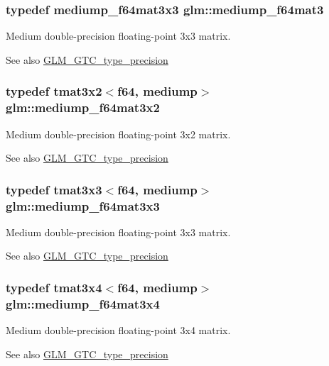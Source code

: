 \subsubsection[{mediump\+\_\+f64mat3}]{\setlength{\rightskip}{0pt plus 5cm}typedef {\bf mediump\+\_\+f64mat3x3} {\bf glm\+::mediump\+\_\+f64mat3}}\label{namespaceglm_ae38a4a0b57e25d9cbb153dcaab9432ec}
Medium double-\/precision floating-\/point 3x3 matrix. \begin{DoxySeeAlso}{See also}
\hyperlink{group__gtc__type__precision}{G\+L\+M\+\_\+\+G\+T\+C\+\_\+type\+\_\+precision} 
\end{DoxySeeAlso}
\hypertarget{namespaceglm_a3f8509c2b3d9918ae271af16e5b7a8a2}{}
\subsubsection[{mediump\+\_\+f64mat3x2}]{\setlength{\rightskip}{0pt plus 5cm}typedef tmat3x2$<${\bf f64}, mediump$>$ {\bf glm\+::mediump\+\_\+f64mat3x2}}\label{namespaceglm_a3f8509c2b3d9918ae271af16e5b7a8a2}
Medium double-\/precision floating-\/point 3x2 matrix. \begin{DoxySeeAlso}{See also}
\hyperlink{group__gtc__type__precision}{G\+L\+M\+\_\+\+G\+T\+C\+\_\+type\+\_\+precision} 
\end{DoxySeeAlso}
\hypertarget{namespaceglm_a22041536da675c1b971deb0d6ca0bba9}{}
\subsubsection[{mediump\+\_\+f64mat3x3}]{\setlength{\rightskip}{0pt plus 5cm}typedef tmat3x3$<${\bf f64}, mediump$>$ {\bf glm\+::mediump\+\_\+f64mat3x3}}\label{namespaceglm_a22041536da675c1b971deb0d6ca0bba9}
Medium double-\/precision floating-\/point 3x3 matrix. \begin{DoxySeeAlso}{See also}
\hyperlink{group__gtc__type__precision}{G\+L\+M\+\_\+\+G\+T\+C\+\_\+type\+\_\+precision} 
\end{DoxySeeAlso}
\hypertarget{namespaceglm_ae0921fdf0249dd34fcb0ccae9c77828b}{}
\subsubsection[{mediump\+\_\+f64mat3x4}]{\setlength{\rightskip}{0pt plus 5cm}typedef tmat3x4$<${\bf f64}, mediump$>$ {\bf glm\+::mediump\+\_\+f64mat3x4}}\label{namespaceglm_ae0921fdf0249dd34fcb0ccae9c77828b}
Medium double-\/precision floating-\/point 3x4 matrix. \begin{DoxySeeAlso}{See also}
\hyperlink{group__gtc__type__precision}{G\+L\+M\+\_\+\+G\+T\+C\+\_\+type\+\_\+precision} 
\end{DoxySeeAlso}
\hypertarget{namespaceglm_a2763f655bfe2141a014e66d26a9d2f18}{}
